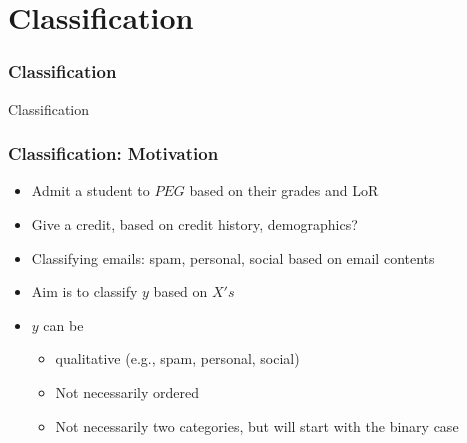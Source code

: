 \documentclass[
  shownotes,
  xcolor={svgnames},
  hyperref={colorlinks,citecolor=DarkBlue,linkcolor=DarkRed,urlcolor=DarkBlue}
  , aspectratio=169]{beamer}
\begin{document}
\section{Classification}
\begin{frame}[fragile]
\frametitle{Classification}


\centering
{\huge \textcolor{andesred}{Classification}}



\end{frame}
\begin{frame}[fragile]
\frametitle{Classification: Motivation}

\begin{itemize}
\item Admit a student to $PEG$ based on their grades and LoR
\medskip
\item Give a credit, based on credit history, demographics?
\medskip
\item Classifying emails: spam, personal, social based on email contents
\medskip
\item Aim is to classify $y$ based on $X's$
\medskip
\item $y$ can be
\begin{itemize}
  \item qualitative (e.g., spam, personal, social)
  \item Not necessarily ordered
  \item Not necessarily two categories, but will start with the binary case

\end{itemize}
\end{itemize}


\end{frame}
\end{document}
